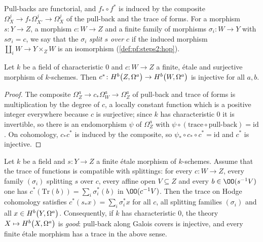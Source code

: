 Pull-backs are functorial, and $f_*\circ f^*$ is induced by the composite $\Omega^j_X\to f_*\Omega^j_{X'}\to\Omega^j_X$ of
the pull-back and the trace of forms. For a morphism $s\colon Y\to Z$, a morphism $c\colon W\to Z$ and a finite
family of morphisms $\sigma_i\colon W\to Y$ with $s\sigma_i=c$, we say that the $\sigma_i$ \emph{split $s$ over $c$} if
the induced morphism $\coprod_iW\to Y\times_ZW$ is an isomorphism (\cref{def:pf:steps2:hop}).

\begin{lemma}\label{pf:geo:hodgeinj}
Let $k$ be a field of characteristic $0$ and $c\colon W\to Z$ a finite, \'etale and surjective morphism of
$k$-schemes. Then $c^*\colon\geoHdg{Z}{a}{b}\to\geoHdg{W}{a}{b}$ is injective for all $a,b$.
\end{lemma}

\begin{proof}
The composite $\Omega^a_Z\to c_*\Omega^a_W\to\Omega^a_Z$ of pull-back and trace of forms is multiplication by the
degree of $c$, a locally constant function which is a positive integer everywhere because $c$ is
surjective; since $k$ has characteristic $0$ it is invertible, so there is an endomorphism $\psi$ of $\Omega^a_Z$
with $\psi\circ(\text{trace}\circ\text{pull-back})=\mathrm{id}$. On cohomology, $c_*c^*$ is induced by the composite,
so $\psi_*\circ c_*\circ c^*=\mathrm{id}$ and $c^*$ is injective.
\end{proof}

\begin{lemma}\label{pf:geo:hodgetr}
Let $k$ be a field and $s\colon Y\to Z$ a finite \'etale morphism of $k$-schemes. Assume that the trace of
functions is compatible with splittings: for every $c\colon W\to Z$, every family $(\sigma_i)$ splitting $s$ over $c$,
every affine open $V\subseteq Z$ and every $b\in\OO(s^{-1}V)$ one has
$c^*(\mathrm{Tr}(b))=\sum_i\sigma_i^*(b)$ in $\OO(c^{-1}V)$. Then the trace on Hodge cohomology satisfies
$c^*(s_*x)=\sum_i\sigma_i^*x$ for all $c$, all splitting families $(\sigma_i)$ and all $x\in\geoHdg{Y}{a}{b}$.
Consequently, if $k$ has characteristic $0$, the theory $X\mapsto\geoHdg{X}{a}{b}$ is \emph{good}: pull-back
along Galois covers is injective, and every finite \'etale morphism has a trace in the above sense.
\end{lemma}

